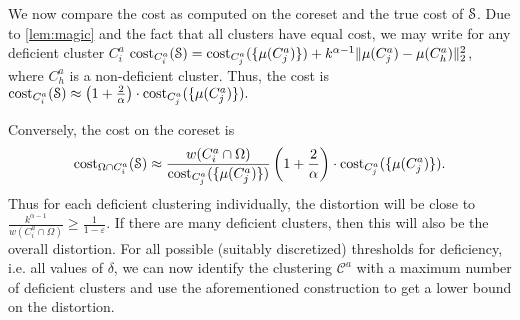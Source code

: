 We now compare the cost as computed on the coreset and the true cost of $\mathcal{S}$. Due to \cref{lem:magic} and the fact that all clusters have equal cost, we may write for any deficient cluster $C_i^a$
$\text{cost}_{C_i^a}(\mathcal{S}) = \text{cost}_{C_j^a}(\{\mu(C_j^a)\}) + k^{\alpha-1}\|\mu(C_j^a)-\mu(C_h^a)\|_2^2$, where $C_h^a$ is a non-deficient cluster.
Thus, the cost is $\text{cost}_{C_i^a}(\mathcal{S}) \approx \left(1+\frac{2}{\alpha}\right)\cdot \text{cost}_{C_j^a}(\{\mu(C_j^a)\}).$

Conversely, the cost on the coreset is 
\begin{align*}
\text{cost}_{\Omega\cap C_i^a}(\mathcal{S})  
 \approx  \frac{w(C_i^a \cap \Omega)}{ \text{cost}_{C_j^a}(\{\mu(C_j^a)\})}\left(1+\frac{2}{\alpha}\right)\cdot \text{cost}_{C_j^a}(\{\mu(C_j^a)\}).
\end{align*}
Thus for each deficient clustering individually, the distortion will be close to $\frac{k^{\alpha-1}}{w(C_i^a \cap \Omega)} \geq \frac{1}{1-\varepsilon}$.
If there are many deficient clusters, then this will also be the overall distortion.
For all possible (suitably discretized) thresholds for deficiency, i.e. all values of $\delta$, we can now identify the clustering $\mathcal{C}^a$ with a maximum number of deficient clusters and use the aforementioned construction to get a lower bound on the distortion.



